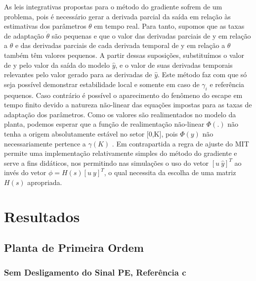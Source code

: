 \documentclass[
	12pt,				%
	openright,			%
	twoside,			%
	a4paper,			%
	english,			%
	french,				%
	spanish,			%
	brazil				%
	]{abntex2}
\begin{document}
 As leis integrativas propostas para o método do gradiente sofrem de um problema, pois é necessário gerar a derivada parcial da saída em relação às estimativas dos parâmetros $\theta$ em tempo real. Para tanto, supomos que as taxas de adaptação $\dot{\theta}$ são pequenas e que o valor das derivadas parciais de y em relação a $\theta$ e das derivadas parciais de cada derivada temporal de y em relação a $\theta$ também têm valores pequenos. A partir dessas suposições, substituímos o valor de y pelo valor da saída do modelo $\hat{y}$, e o valor de suas derivadas temporais relevantes pelo valor gerado para as derivadas de $\hat{y}$. Este método faz com que só seja possível demonstrar estabilidade local e somente em caso de $\gamma_i$ e referência pequenos. Caso contrário é possível o aparecimento do fenômeno do escape em tempo finito devido a natureza não-linear das equações impostas para as taxas de adaptação dos parâmetros. Como os valores são realimentados no modelo da planta, podemos esperar que a função de realimentação não-linear $\Phi(.)$ não tenha a origem absolutamente estável no setor [0,K], pois $\Phi(y)$ não necessariamente pertence a $\gamma(K)$  \cite{khalil}. Em contrapartida a regra de ajuste do MIT permite uma implementação relativamente simples do método do gradiente e serve a fins didáticos, nos permitindo nas simulações o uso do vetor $[u~\hat{y}]^T$ ao invés do vetor $\phi=H(s)[u~y]^T$, o qual necessita da escolha de uma matriz $H(s)$ apropriada. 
 



\part{Resultados}
\chapter{Planta de Primeira Ordem}
\section{Sem Desligamento do Sinal PE, Referência c}
\end{document}
